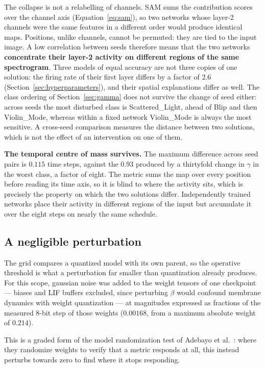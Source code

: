 The collapse is not a relabelling of channels. SAM sums the contribution scores
over the channel axis (Equation~\ref{eq:sam}), so two networks whose layer-2
channels were the same features in a different order would produce identical
maps. Positions, unlike channels, cannot be permuted: they are tied to the input
image. A low correlation between seeds therefore means that the two networks
\textbf{concentrate their layer-2 activity on different regions of the same
spectrogram}. Three models of equal accuracy are not three copies of one
solution: the firing rate of their first layer differs by a factor of $2.6$
(Section~\ref{sec:hyperparameters}), and their spatial explanations differ as
well. The class ordering of Section~\ref{sec:gamma} does not survive the change of
seed either: across seeds the most disturbed class is Scattered\_Light, ahead of
Blip and then Violin\_Mode, whereas within a fixed network Violin\_Mode is always
the most sensitive. A cross-seed comparison measures the distance between two
solutions, which is not the effect of an intervention on one of them.

\textbf{The temporal centre of mass survives.} The maximum difference across seed
pairs is $0.115$ time steps, against the $0.93$ produced by a thirtyfold change in
$\gamma$ in the worst class, a factor of eight. The metric sums the map over every
position before reading its time axis, so it is blind to where the activity
sits, which is precisely the property on which the two solutions differ.
Independently trained networks place their activity in different regions of the
input but accumulate it over the eight steps on nearly the same schedule.

\subsection{A negligible perturbation}
\label{sec:perturbation}

The grid compares a quantized model with its own parent, so the operative
threshold is what a perturbation far smaller than quantization already produces.
For this scope, gaussian noise was added to the weight tensors of one checkpoint --- biases and
LIF buffers excluded, since perturbing $\beta$ would confound membrane dynamics
with weight quantization --- at magnitudes expressed as fractions of the measured
8-bit step of those weights ($0.00168$, from a maximum absolute weight of
$0.214$).

This is a graded form of the model randomization test of Adebayo et
al.~\cite{adebayo2018sanity}: where they randomize weights to verify that a
metric responds at all, this instead perturbs towards zero to find where it stops
responding.


